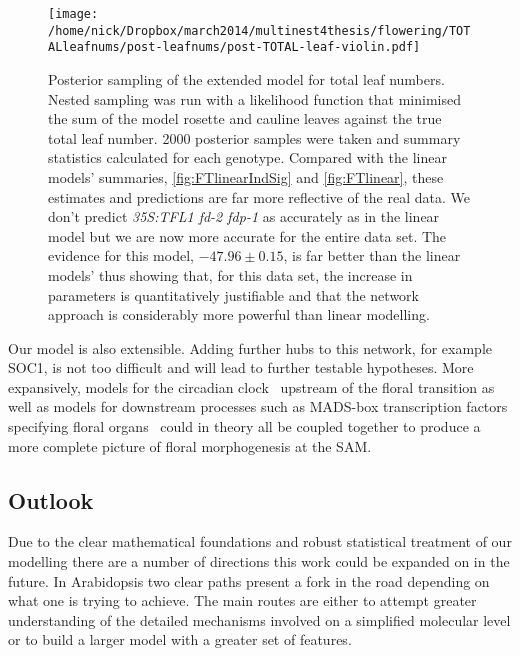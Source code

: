 \begin{figure*}[!htbp]
\centering
\texttt{[image: /home/nick/Dropbox/march2014/multinest4thesis/flowering/TOTALleafnums/post-leafnums/post-TOTAL-leaf-violin.pdf]}
\caption{Posterior sampling of the extended model for total leaf numbers.
Nested sampling was run with a likelihood function that minimised the sum of the model rosette and cauline leaves against the true total leaf number.
2000 posterior samples were taken and summary statistics calculated for each genotype.
Compared with the linear models' summaries, \autoref{fig:FTlinearIndSig} and \autoref{fig:FTlinear}, these estimates and predictions are far more reflective of the real data.
We don't predict \emph{35S:TFL1 fd-2 fdp-1} as accurately as in the linear model but we are now more accurate for the entire data set.
The evidence for this model, $-47.96\pm 0.15$, is far better than the linear models' thus showing that, for this data set, the increase in parameters is quantitatively justifiable and that the network approach is considerably more powerful than linear modelling.
}
\label{fig:TotalLeafViolin}
\end{figure*}

Our model is also extensible.
Adding further hubs to this network, for example SOC1, is not too difficult and will lead to further testable hypotheses.
More expansively, models for the circadian clock~\cite{song2012} upstream of the floral transition as well as models for downstream processes such as MADS-box transcription factors specifying floral organs~\cite{vanmourik2010} could in theory all be coupled together to produce a more complete picture of floral morphogenesis at the SAM.

\subsection{Outlook}

Due to the clear mathematical foundations and robust statistical treatment of our modelling there are a number of directions this work could be expanded on in the future.
In Arabidopsis two clear paths present a fork in the road depending on what one is trying to achieve.
The main routes are either to attempt greater understanding of the detailed mechanisms involved on a simplified molecular level or to build a larger model with a greater set of features.

